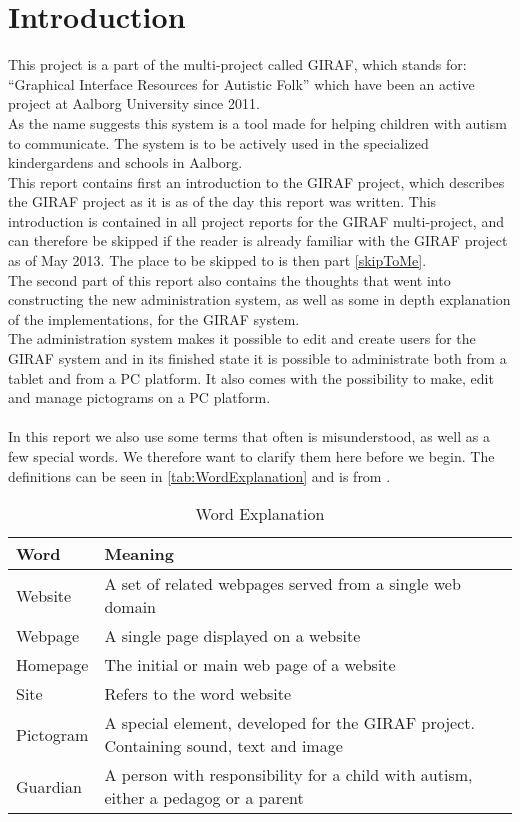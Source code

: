 \chapter*{Introduction}
\label{introduction}
\vspace{-2.0em}
This project is a part of the multi-project called GIRAF, which stands for: ``Graphical Interface Resources for Autistic Folk'' which have been an active project at Aalborg University since 2011.\\
As the name suggests this system is a tool made for helping children with autism to communicate. The system is to be actively used in the specialized kindergardens and schools in Aalborg.\\
This report contains first an introduction to the GIRAF project, which describes the GIRAF project as it is as of the day this report was written. This introduction is contained in all project reports for the GIRAF multi-project, and can therefore be skipped if the reader is already familiar with the GIRAF project as of May 2013. The place to be skipped to is then part \vref{skipToMe}.\\
The second part of this report also contains the thoughts that went into constructing the new administration system, as well as some in depth explanation of the implementations, for the GIRAF system.\\
The administration system makes it possible to edit and create users for the GIRAF system and in its finished state it is possible to administrate both from a tablet and from a PC platform. It also comes with the possibility to make, edit and manage pictograms on a PC platform.\\
\\
In this report we also use some terms that often is misunderstood, as well as a few special words. We therefore want to clarify them here before we begin. The definitions can be seen in \autoref{tab:WordExplanation} and is from \citep{wikipedia}.


\begin{table}[h]
        \centering
                \begin{tabularx}{\textwidth}{|l|X|}
                        \hline
                        Word & Meaning\\\hline\hline
                        Website & A set of related webpages served from a single web domain\\\hline
                        Webpage & A single page displayed on a website\\\hline
                        Homepage & The initial or main web page of a website\\\hline
                        Site & Refers to the word website\\\hline
                        Pictogram & A special element, developed for the GIRAF project. Containing sound, text and image\\\hline
                        Guardian & A person with responsibility for a child with autism, either a pedagog or a parent\\\hline
                \end{tabularx}
        \caption{Word Explanation}
        \label{tab:WordExplanation}
\end{table}
